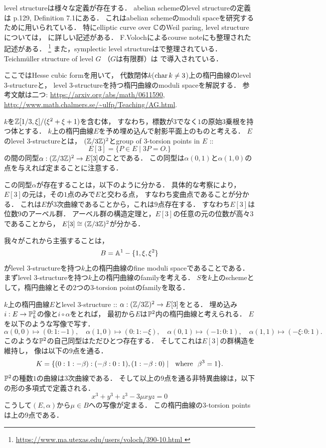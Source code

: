 \documentclass[a4paper]{jsarticle}
\begin{document}
    level structureは様々な定義が存在する．
    abelian schemeのlevel structureの定義は
    \cite{GIT} p.129, Definition 7.1にある．
    これはabelian schemeのmoduli spaceを研究するために用いられている．
    特にelliptic curve over $\mathbb{C}$のWeil paring, level structureについては，
    \cite{DiaShur}に詳しい記述がある．
    F.Volochによるcourse noteにも整理された記述がある．
    \footnote{\url{ https://www.ma.utexas.edu/users/voloch/390-10.html }}
    また，symplectic level structureは\cite{CFMSC}で整理されている．
    Teichm\"uller structure of level $G$ （$G$は有限群）は
    \cite{IrrOfMg}で導入されている．

    ここではHesse cubic formを用いて，
    代数閉体$k$($\operatorname{char} k \neq 3$)上の楕円曲線のlevel $3$-structureと，
    level $3$-structureを持つ楕円曲線のmoduli spaceを解説する．
    参考文献は二つ:
    \url{https://arxiv.org/abs/math/0611590}, 
    \url{http://www.math.chalmers.se/~ulfp/Teaching/AG.html}.

    $k$を$\mathbb{Z}[1/3, \xi]/(\xi^2+\xi+1)$を含む体，
    すなわち，標数が$3$でなく$1$の原始$3$乗根を持つ体とする．
    $k$上の楕円曲線$E$を予め埋め込んで射影平面上のものと考える．
    $E$のlevel $3$-structureとは，
    $(\mathbb{Z}/3\mathbb{Z})^2$とgroup of $3$-torsion points in $E$ :: 
    \[ E[3]=\{ P \in E \mid 3P=O. \} \]
    の間の同型$\alpha: (\mathbb{Z}/3\mathbb{Z})^2 \to E[3]$のことである．
    この同型は$\alpha(0, 1)$と$\alpha(1, 0)$の点を与えれば定まることに注意する．

    この同型$\alpha$が存在することは，以下のように分かる．
    具体的な考察により，$E[3]$の元は，その$1$点のみで$E$と交わる点，
    すなわち変曲点であることが分かる．
    これは$E$が$3$次曲線であることから，これは$9$点存在する．
    すなわち$E[3]$は位数$9$のアーベル群．
    アーベル群の構造定理と，$E[3]$の任意の元の位数が高々$3$であることから，
    $E[3] \cong (\mathbb{Z}/3\mathbb{Z})^2$が分かる．

    我々がこれから主張することは，
    \[ B=\mathbb{A}^1-\{ 1, \xi, \xi^2 \} \]
    がlevel $3$-structureを持つ$k$上の楕円曲線のfine moduli spaceであることである．
    まずlevel $3$-structureを持つ$k$上の楕円曲線のfamilyを考える．
    $S$を$k$上のschemeとして，楕円曲線とその$2$つの$3$-torsion pointのfamilyを取る．
    
    $k$上の楕円曲線$E$とlevel $3$-structure :: $\alpha: (\mathbb{Z}/3\mathbb{Z})^2 \to E[3]$をとる．
    埋め込み$i: E \to \mathbb{P}_k^2$の像と$i \circ \alpha$をとれば，
    最初から$E$は$\mathbb{P}^2$内の楕円曲線と考えられる．
    $E$を以下のような写像で写す．
    \[
        \alpha(0,0) \mapsto (0:1:-1), \quad
        \alpha(1,0) \mapsto (0:1:-\xi), \quad
        \alpha(0,1) \mapsto (-1:0:1), \quad
        \alpha(1,1) \mapsto (-\xi:0:1).
    \]
    このような$\mathbb{P}^2$の自己同型はただひとつ存在する．
    そしてこれは$E[3]$の群構造を維持し，
    像は以下の$9$点を通る．
    \[ K=\{ (0:1:-\beta) : (-\beta : 0 : 1), (1 : -\beta : 0) \mid ~~\text{where}~~ \beta^3=1 \}. \]
    $\mathbb{P}^2$の種数$1$の曲線は$3$次曲線である．
    そして以上の$9$点を通る非特異曲線は，以下の形の多項式で定義される．
    \[ x^3+y^3+z^3-3 \mu xyz=0 \]
    こうして$(E, \alpha)$から$\mu \in B$への写像が定まる．
    この楕円曲線の$3$-torsion pointsは上の$9$点である．
    
\end{document}
